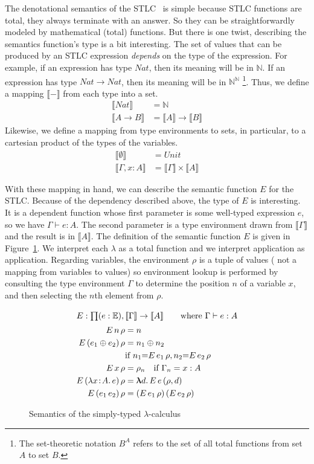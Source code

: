 \documentclass{tufte-handout}
\newcommand{\SEM}[1]{\llbracket #1 \rrbracket}
\newcommand{\LAM}[1]{\lambda #1.\,}
\newcommand{\MLAM}[1]{\boldsymbol\uplambda #1.\,}
\newcommand{\APP}[0]{\,}
\newcommand{\of}[0]{\!:\!}
\newcommand{\NAT}[0]{\mathbb{N}}
\newcommand{\NATTY}[0]{\mathit{Nat}}
\newcommand{\UNITTY}[0]{\mathit{Unit}}
\newcommand{\EXP}[0]{\mathbb{E}}
\begin{document}
The denotational semantics of the STLC~\citep{Henkin:1950aa} is simple
because STLC functions are total, they always terminate with an
answer. So they can be straightforwardly modeled by mathematical
(total) functions. But there is one twist, describing the semantics
function's type is a bit interesting.  The set of values that can be
produced by an STLC expression \emph{depends} on the type of the
expression. For example, if an expression has type $\NATTY$, then its
meaning will be in $\NAT$. If an expression has type $\NATTY \to
\NATTY$, then its meaning will be in $\NAT^{\NAT}$
\footnote{The set-theoretic notation $B^A$ refers to the set of all
  total functions from set $A$ to set $B$.}.  Thus, we define a
mapping $\SEM{-}$ from each type into a set.
\begin{align*}
  \SEM{\NATTY} &= \mathbb{N} \\
  \SEM{A \to B} &= \SEM{A}\to \SEM{B}
\end{align*}
Likewise, we define a mapping from type environments to sets, in
particular, to a cartesian product of the types of the variables.
\begin{align*}
  \SEM{\emptyset} &= \UNITTY \\
  \SEM{\Gamma,x\of A} &= \SEM{\Gamma} \times \SEM{A}
\end{align*}

With these mapping in hand, we can describe the semantic function $E$
for the STLC. Because of the dependency described above, the type of
$E$ is interesting. It is a dependent function whose first parameter
is some well-typed expression $e$, so we have $\Gamma \vdash e : A$.
The second parameter is a type environment drawn from $\SEM{\Gamma}$
and the result is in $\SEM{A}$.  The definition of the semantic
function $E$ is given in Figure~\ref{fig:sem-stlc}.  We interpret each
$\lambda$ as a total function and we interpret application as
application. Regarding variables, the environment $\rho$ is a tuple of
values ( not a mapping from variables to values) so environment lookup
is performed by consulting the type environment $\Gamma$ to determine
the position $n$ of a variable $x$, and then selecting the $n$th
element from $\rho$.


\begin{figure}[tbp]
\begin{align*}
\intertext{$E : \prod (e : \EXP), \SEM{\Gamma} \to \SEM{A} \qquad \text{where } \Gamma \vdash e : A$}
  E\,n\,\rho &= n \\
  E\,(e_1\oplus e_2)\,\rho &= n_1 \oplus n_2 \\
     & \text{if } n_1 {=} E\,e_1\,\rho, n_2 {=} E\,e_2\,\rho \\
  E\,x\,\rho &= \rho_n \quad \text{if } \Gamma_n = x:A \\
  E\,(\LAM{x\of A}e)\,\rho &= \MLAM{d} E\,e\,(\rho,d) \\
  E\,(e_1 \APP e_2)\,\rho &= (E\,e_1\,\rho) \APP (E\,e_2\,\rho)
\end{align*}

\caption{Semantics of the simply-typed $\lambda$-calculus}
\label{fig:sem-stlc}
\end{figure}
\end{document}
